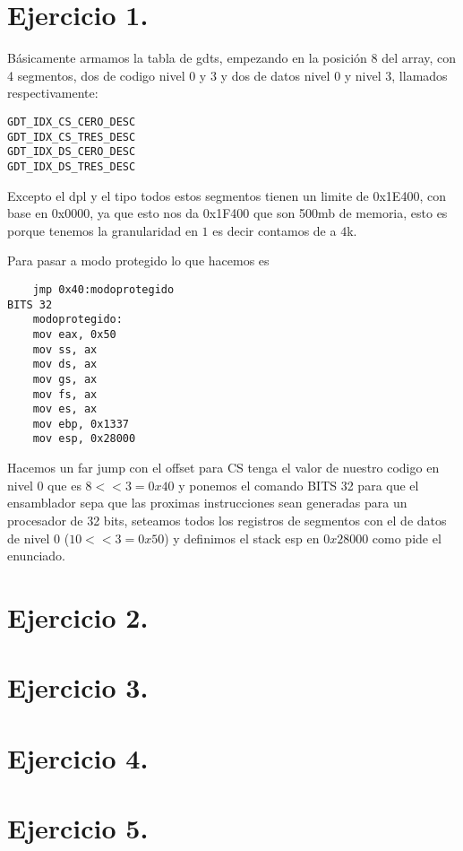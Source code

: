 \documentclass[a4paper]{article}
\begin{document}
\thispagestyle{empty}


\maketitle 

\tableofcontents

\newpage

\section{Ejercicio 1.}
\noindent Básicamente armamos la tabla de gdts, empezando en la posición $8$ del array, con 4 segmentos, dos de codigo nivel $0$ y $3$ y dos de datos nivel $0$ y nivel $3$, llamados respectivamente:

\begin{codesnippet}
\begin{verbatim}
GDT_IDX_CS_CERO_DESC
GDT_IDX_CS_TRES_DESC
GDT_IDX_DS_CERO_DESC
GDT_IDX_DS_TRES_DESC
\end{verbatim}
\end{codesnippet}

\noindent Excepto el dpl y el tipo todos estos segmentos tienen un limite de 0x1E400, con base en 0x0000, ya que esto nos da 0x1F400 que son 500mb de memoria, esto es porque tenemos la granularidad en $1$ es decir contamos de a $4$k.

Para pasar a modo protegido lo que hacemos es
\begin{codesnippet}
\begin{verbatim}
    jmp 0x40:modoprotegido
BITS 32
    modoprotegido:
    mov eax, 0x50
    mov ss, ax
    mov ds, ax
    mov gs, ax
    mov fs, ax
    mov es, ax
    mov ebp, 0x1337
    mov esp, 0x28000
\end{verbatim}
\end{codesnippet}

\noindent Hacemos un far jump con el offset para CS tenga el valor de nuestro codigo en nivel $0$ que es $8 << 3 = 0x40$ y ponemos el comando BITS 32 para que el ensamblador sepa que las proximas instrucciones sean generadas para un procesador de 32 bits, seteamos todos los registros de segmentos con el de datos de nivel $0$ ($10 << 3 = 0x50$) y definimos el stack esp en $0x28000$ como pide el enunciado. 
\section{Ejercicio 2.}
\section{Ejercicio 3.}
\section{Ejercicio 4.}
\section{Ejercicio 5.}
\end{document}
